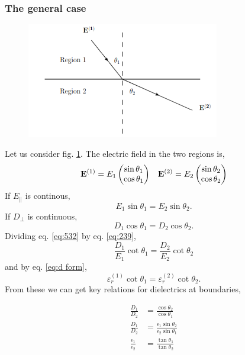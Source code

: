 \documentclass{book}
\begin{document}
\subsubsection{The general case}
\begin{figure}
	\centering
	\includegraphics[width=0.75\textwidth]{interface1.png}
	\caption{}
	\label{fig:interface2}
\end{figure}
Let us consider fig. \ref{fig:interface2}. The electric field in the two regions is,
\begin{align}
	\vb{E}^{(1)} = E_1\begin{pmatrix}
		\sin\theta_1 \\ \cos\theta_1
	\end{pmatrix} && \vb{E}^{(2)} = E_2\begin{pmatrix}
	\sin\theta_2 \\ \cos\theta_2
	\end{pmatrix}
\end{align}
If $E_{\parallel}$ is continous,
\begin{equation}
	E_1\sin\theta_1 = E_2\sin\theta_2. \label{eq:239}
\end{equation}
If $D_{\perp}$ is continuous,
\begin{equation}
	D_1\cos\theta_1 = D_2\cos\theta_2. \label{eq:532}
\end{equation}
Dividing eq. \eqref{eq:532} by eq. \eqref{eq:239}, 
\begin{equation}
	\frac{D_1}{E_1}\cot\theta_1 = \frac{D_2}{E_2}\cot\theta_2
\end{equation}
and by eq. \eqref{eq:d form},
\begin{equation}
	\varepsilon_r^{(1)}\cot\theta_1 = \varepsilon_r^{(2)}\cot\theta_2.
\end{equation}
From these we can get key relations for dielectrics at boundaries,
\begin{mybox}
	\begin{align}
		\frac{D_1}{D_2} & = \frac{\cos\theta_2}{\cos\theta_1} \\
		\frac{D_1}{D_2} & = \frac{\epsilon_1 \sin\theta_2}{\epsilon_2 \sin\theta_1} \\
		\frac{\epsilon_1}{\epsilon_2} & = \frac{\tan\theta_1}{\tan\theta_2}
	\end{align}
\end{mybox}
\end{document}
